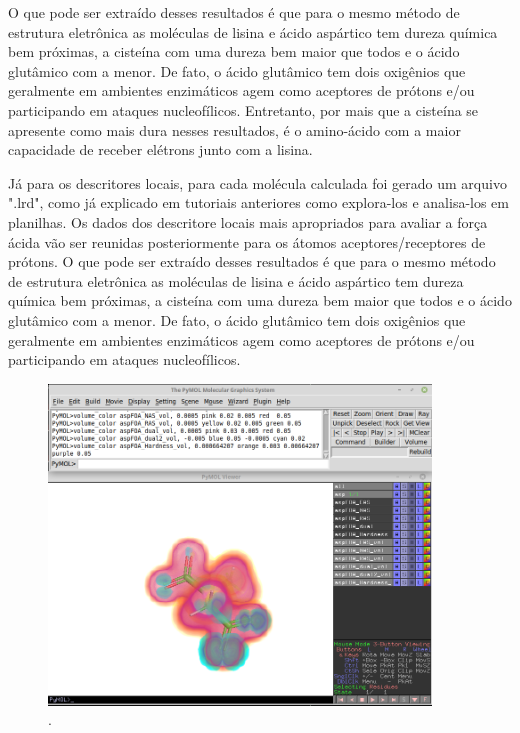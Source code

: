 \documentclass[a4paper,11pt]{refart}
\begin{document}
O que pode ser extraído desses resultados é que para o mesmo método de estrutura eletrônica as moléculas de lisina e ácido aspártico tem dureza química bem próximas, a cisteína com uma dureza bem maior que todos e o ácido glutâmico com a menor. De fato, o ácido glutâmico tem dois oxigênios que geralmente em ambientes enzimáticos agem como aceptores de prótons e/ou participando em ataques nucleofílicos. Entretanto, por mais que a cisteína se apresente como mais dura nesses resultados, é o amino-ácido com a maior capacidade de receber elétrons junto com a lisina. 

Já para os descritores locais, para cada molécula calculada foi gerado um arquivo ".lrd", como já explicado em tutoriais anteriores como explora-los e analisa-los em planilhas. Os dados dos descritore locais mais apropriados para avaliar a força ácida vão ser reunidas posteriormente para os átomos aceptores/receptores de prótons. 
O que pode ser extraído desses resultados é que para o mesmo método de estrutura eletrônica as moléculas de lisina e ácido aspártico tem dureza química bem próximas, a cisteína com uma dureza bem maior que todos e o ácido glutâmico com a menor. De fato, o ácido glutâmico tem dois oxigênios que geralmente em ambientes enzimáticos agem como aceptores de prótons e/ou participando em ataques nucleofílicos. 



\hspace*{-\leftmarginwidth}
\begin{minipage}{\fullwidth}
	\begin{figure}[H]
		\begin{center}
			\includegraphics[width=4in]{images/tut4_img9}
			\caption{.}
			\label{fig_tut4_7}
		\end{center}
	\end{figure}
\end{minipage}
\end{document}
